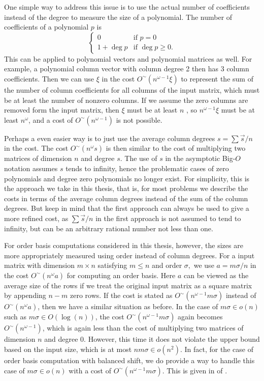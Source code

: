One simple way to address this issue is to use the actual number of
coefficients instead of the degree to measure the size of a polynomial.
The number of coefficients of a polynomial $p$ is 
\[
\begin{cases}
0 & \mbox{if }p=0\\
1+\deg p & \mbox{if }\deg p\ge0.
\end{cases}
\]
This can be applied to polynomial vectors and polynomial matrices
as well. For example, a polynomial column vector with column degree
2 then has 3 column coefficients. Then we can use $\xi$ in the cost
$O^{\sim}\left(n^{\omega-1}\xi\right)$ to represent the sum of the
number of column coefficients for all columns of the input matrix,
which must be at least the number of nonzero columns. If we assume
the zero columns are removed form the input matrix, then $\xi$ must
be at least $n$ , so $n^{\omega-1}\xi$ must be at least $n^{\omega}$,
and a cost of $O^{\sim}\left(n^{\omega-1}\right)$ is not possible.

Perhaps a even easier way is to just use the average column degrees
$s=\sum\vec{s}/n$ in the cost. The cost $O^{\sim}(n^{\omega}s)$
is then similar to the cost of multiplying two matrices of dimension
$n$ and degree $s$. The use of $s$ in the asymptotic Big-$O$ notation
assumes $s$ tends to infinity, hence the problematic cases of zero
polynomials and degree zero polynomials no longer exist. For simplicity,
this is the approach we take in this thesis, that is, for most problems
we describe the costs in terms of the average column degrees instead
of the sum of the column degrees. But keep in mind that the first
approach can always be used to give a more refined cost, as $\sum\vec{s}/n$
in the first approach is not assumed to tend to infinity, but can
be an arbitrary rational number not less than one.

For order basis computations considered in this thesis, however, the
sizes are more appropriately measured using order instead of column
degrees. For a input matrix with dimension $m\times n$ satisfying
$m\le n$ and order $\sigma,$ we use $a=m\sigma/n$ in the cost $O^{\sim}\left(n^{\omega}a\right)$
for computing an order basis. Here $a$ can be viewed as the average
size of the rows if we treat the original input matrix as a square
matrix by appending $n-m$ zero rows. If the cost is stated as $O^{\sim}\left(n^{\omega-1}m\sigma\right)$
instead of $O^{\sim}\left(n^{\omega}a\right)$, then we have a similar
situation as before. In the case of $m\sigma\in o\left(n\right)$
such as $m\sigma\in O\left(\log\left(n\right)\right)$, the cost $O^{\sim}\left(n^{\omega-1}m\sigma\right)$
again becomes $O^{\sim}\left(n^{\omega-1}\right)$, which is again
less than the cost of multiplying two matrices of dimension $n$ and
degree 0. However, this time it does not violate the upper bound based
on the input size, which is at most $nm\sigma\in o(n^{2})$. In fact,
for the case of order basis computation with balanced shift, we do
provide a way to handle this case of $m\sigma\in o\left(n\right)$
with a cost of $O^{\sim}\left(n^{\omega-1}m\sigma\right)$. This is
given in  of .


